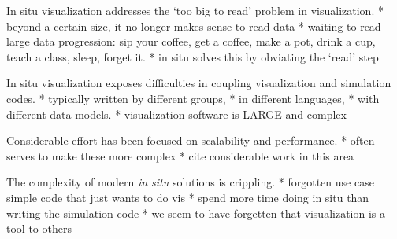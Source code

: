 In situ visualization addresses the `too big to read' problem in
visualization.
	* beyond a certain size, it no longer makes sense to read data
  * waiting to read large data progression: sip your coffee, get a
  coffee, make a pot, drink a cup, teach a class, sleep, forget it.
	* in situ solves this by obviating the `read' step

In situ visualization exposes difficulties in coupling visualization
and simulation codes.
	* typically written by different groups,
	* in different languages,
	* with different data models.
	* visualization software is LARGE and complex

Considerable effort has been focused on scalability and performance.
	* often serves to make these more complex
	* cite considerable work in this area

The complexity of modern \textit{in situ} solutions is crippling.
	* forgotten use case simple code that just wants to do vis
	* spend more time doing in situ than writing the simulation code
	* we seem to have forgetten that visualization is a tool to others


